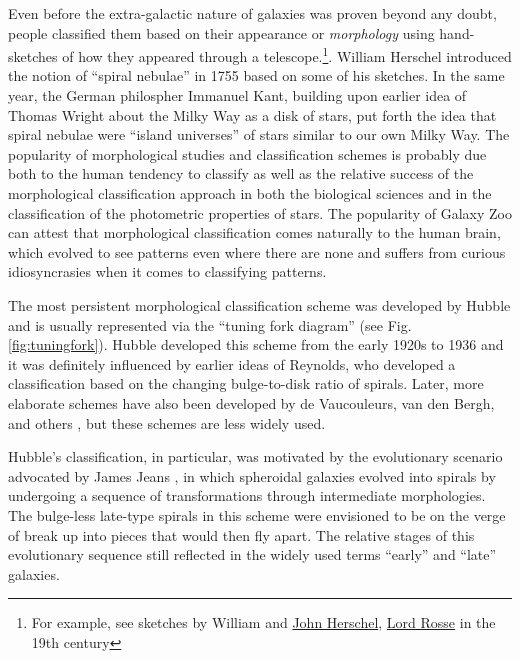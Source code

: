 Even before the extra-galactic nature of galaxies was proven beyond any doubt, people classified them based on their appearance or {\it morphology} using 
hand-sketches of how they appeared through a telescope.\footnote{For example, see sketches by William and \href{http://prints.royalsociety.org/artist/28272/john-frederick-william-herschel}{John Herschel}, \href{http://en.wikipedia.org/wiki/William_Parsons,_3rd_Earl_of_Rosse}{Lord Rosse} in the 19th century}. William Herschel introduced the notion of ``spiral nebulae'' in 1755 based on some of his sketches. In the same year, the German philospher Immanuel Kant, building upon earlier idea of Thomas Wright about the Milky Way as a disk of stars, put forth the idea that spiral nebulae were ``island universes'' of stars similar to our own Milky Way. 
The popularity of morphological studies and classification schemes is probably due both to the human tendency to classify as well as the relative success of the morphological classification approach in both the
biological sciences and in the classification of the photometric properties of stars. The popularity of Galaxy Zoo can attest that morphological classification comes naturally to the human brain, which evolved to see patterns even where there are none and suffers from curious idiosyncrasies \href{http://adsabs.harvard.edu/abs/2008MNRAS.388.1686L}{\citep{land_etal08}} when it comes to classifying patterns. 


The most persistent morphological classification scheme was developed by Hubble \href{http://adsabs.harvard.edu/abs/1926ApJ....64..321H}{\citep{hubble26}} and is usually represented via the ``tuning fork diagram'' (see Fig. \ref{fig:tuningfork}). Hubble developed this scheme  from the early 1920s to 1936 and it was definitely influenced by earlier ideas of Reynolds, who developed a classification based on the changing bulge-to-disk ratio of spirals.  Later, more elaborate schemes have also been developed  by de Vaucouleurs, van den Bergh, and others 
 \href{http://adsabs.harvard.edu/abs/2005ARA\%26A..43..581S}{\citep[see][for a comprehensive review]{sandage05}}, but these schemes are less widely used. 

Hubble's classification, in particular, was motivated by the evolutionary scenario advocated by James Jeans \href{http://adsabs.harvard.edu/abs/1919pcsd.book.....J}{\citep{jeans19b}}, in which spheroidal galaxies evolved into spirals by undergoing a sequence of transformations through intermediate morphologies. The bulge-less late-type spirals in this scheme were envisioned to be on the verge of break up into pieces that would then fly apart. The relative stages of this evolutionary sequence still reflected in the widely used terms ``early'' and ``late'' galaxies.

